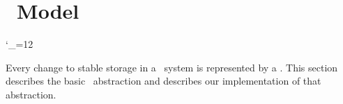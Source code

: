 
\section{\Patch\ Model}
\label{sec:patch}

\makeatletter
\let\emptyset\varnothing
{\catcode`\_=12\gdef\_{_}}
\newcommand{\PBlock}[1]{\ensuremath{\textit{blk}[{#1}]}}
\newcommand{\PB}{\ensuremath{B}}
\newcommand{\PSetlim}[1]{\def\@next{#1}\ifx\@next\@empty\else_{\@next}\fi}
\newcommand{\PMem}[1][]{\ensuremath{\mathpatchset{U}\PSetlim{#1}}}
\newcommand{\PInf}[1][]{\ensuremath{\mathpatchset{F}\PSetlim{#1}}}
\newcommand{\PDisk}[1][]{\ensuremath{\mathpatchset{C}\PSetlim{#1}}}
\newcommand{\PHard}[1][]{\ensuremath{\textit{\Nrb}\PSetlim{#1}}}
\newcommand{\PSoft}[1][]{\ensuremath{\textit{\Rb}\PSetlim{#1}}}
\newcommand{\PEmpty}[1][]{\ensuremath{\textit{\Noop}\PSetlim{#1}}}
\newcommand{\PDDepset}[1]{\ensuremath{\textit{ddep}[#1]}}
\newcommand{\PDepend}{\ensuremath{\leadsto}}
\newcommand{\PDDepend}{\ensuremath{\rightarrow}}
\newcommand{\PDepset}[1]{\ensuremath{\textit{dep}[#1]}}
\newcommand{\PRDepset}[1]{\ensuremath{\textit{RDep}[#1]}}
\makeatother

Every change to stable storage in a \Kudos\ system is represented by a
\emph{\patch}.
%
This section describes the basic \patch\ abstraction
 and describes our implementation of that abstraction.

\begin{comment}
%
%
Each \patch\ $p$ encapsulates four important pieces of information: its
 \emph{block}, its \emph{state}, a set of \emph{direct dependencies}, and
 some \emph{undo data}.
\end{comment}

